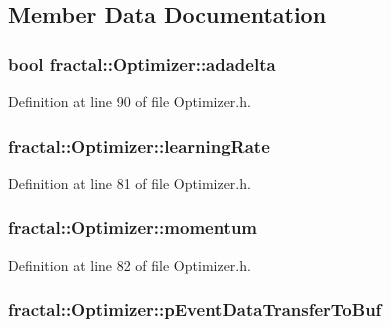 \subsection{Member Data Documentation}
\hypertarget{classfractal_1_1Optimizer_a1a823fe0fb44a4760516c76cd5686cb9}{
\subsubsection[{adadelta}]{\setlength{\rightskip}{0pt plus 5cm}bool fractal\+::\+Optimizer\+::adadelta\hspace{0.3cm}{\ttfamily [protected]}}}\label{classfractal_1_1Optimizer_a1a823fe0fb44a4760516c76cd5686cb9}


Definition at line 90 of file Optimizer.\+h.

\hypertarget{classfractal_1_1Optimizer_ab900db4006216b5dbf8ca9d8b8f91014}{
\subsubsection[{learning\+Rate}]{ fractal\+::\+Optimizer\+::learning\+Rate\hspace{0.3cm}{\ttfamily [protected]}}}\label{classfractal_1_1Optimizer_ab900db4006216b5dbf8ca9d8b8f91014}


Definition at line 81 of file Optimizer.\+h.

\hypertarget{classfractal_1_1Optimizer_aa315327874078b0221eaceeb744338fc}{
\subsubsection[{momentum}]{ fractal\+::\+Optimizer\+::momentum\hspace{0.3cm}{\ttfamily [protected]}}}\label{classfractal_1_1Optimizer_aa315327874078b0221eaceeb744338fc}


Definition at line 82 of file Optimizer.\+h.

\hypertarget{classfractal_1_1Optimizer_aff318edfab3e05da288fcf795918217b}{
\subsubsection[{p\+Event\+Data\+Transfer\+To\+Buf}]{ fractal\+::\+Optimizer\+::p\+Event\+Data\+Transfer\+To\+Buf\hspace{0.3cm}{\ttfamily [protected]}}}\label{classfractal_1_1Optimizer_aff318edfab3e05da288fcf795918217b}


